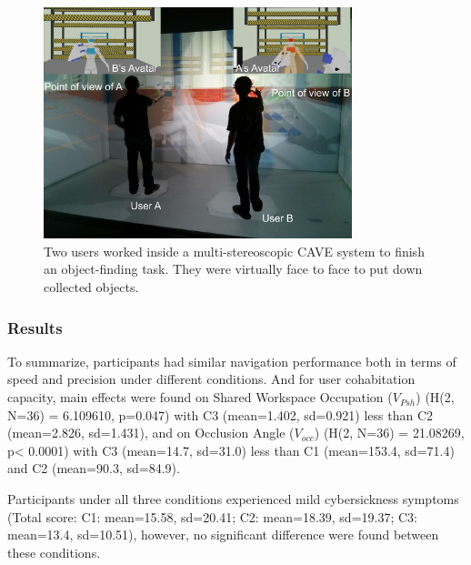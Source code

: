 \begin{figure}[tb]
  \centering
  \includegraphics[width=0.8\textwidth]{figures/ch3/teaser_exp1}
  \caption{\label{fig:3_teaser_exp1}Two users worked inside a multi-stereoscopic CAVE system to finish an object-finding task. They were virtually face to face to put down collected objects.}
\end{figure}

\subsubsection{Results}
To summarize, participants had similar navigation performance both in terms of speed and precision under different conditions. And for user cohabitation capacity, main effects were found on Shared Workspace Occupation ($V_{Psh}$) (H(2, N=36) = 6.109610, p=0.047) with C3 (mean=1.402, sd=0.921) less than C2 (mean=2.826, sd=1.431), and on Occlusion Angle ($V_{occ}$) (H(2, N=36) = 21.08269, p\textless{} 0.0001) with C3 (mean=14.7, sd=31.0) less than C1 (mean=153.4, sd=71.4) and C2 (mean=90.3, sd=84.9).

Participants under all three conditions experienced mild cybersickness symptoms (Total score: C1: mean=15.58, sd=20.41; C2: mean=18.39, sd=19.37; C3: mean=13.4, sd=10.51), however, no significant difference were found between these conditions.

